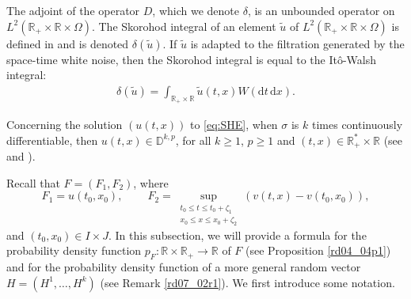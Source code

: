 \documentclass[12pt,a4paper]{article}
\newcommand{\bD}{{\mathbb{D}}}
\newcommand{\R}{{\mathbb{R}}}
\renewcommand{\d}{\mathrm{d}}
\newcommand {\deltah}{{\zeta}}
\newcommand{\<}{\langle}
\renewcommand{\>}{\rangle}
\begin{document}
 The adjoint of the operator $D$, which we denote $\delta$, is an unbounded operator on $L^2(\R_+ \times \R \times \Omega)$. The Skorohod integral of an element $\tilde u$ of $L^2(\R_+ \times \R \times \Omega)$ is defined in \cite[Section 1.3.2]{nualart2006} and is denoted $\delta(\tilde u)$. If $\tilde u$ is adapted to the filtration generated by the space-time white noise, then the Skorohod integral is equal to the It\^o-Walsh integral:
 \begin{align*}
     \delta(\tilde u) = \int_{\R_+ \times \R} \tilde u(t, x) W(\d t\, \d x).
 \end{align*}
 
 Concerning the solution $(u(t, x))$ to \eqref{eq:SHE}, when $\sigma$ is $k$ times continuously differentiable, then $u(t, x) \in \bD^{k, p}$, for all $k \geq 1$, $p \geq 1$ and $(t, x) \in \R_+^* \times \R$ (see \cite[Theorem 2.4.3 \& Proposition 2.4.4]{nualart2006} and \cite[Proposition 4.1]{DKN09}).
 \medskip
 
 \medskip
 
 Recall that $F = (F_1, F_2)$, where
 \[
     F_1=u(t_0,x_0),\qquad\ F_2=  \sup _{\substack {t_0\le t \le t_0+\deltah_1 \\ x_0\le x \le x_0+\deltah_2}}
(v(t,x)-v(t_0,x_0)),
\]
and $(t_0, x_0) \in I \times J$.
 In this subsection, we will provide a formula for the probability density function $p_F: \R \times \R_+ \to \R$ of $F$ (see Proposition \ref{rd04_04p1}) and for the probability density function of a more general random vector $H = (H^1,\dots, H^k)$ (see Remark \ref{rd07_02r1}). We first introduce some notation.
 
\end{document}
